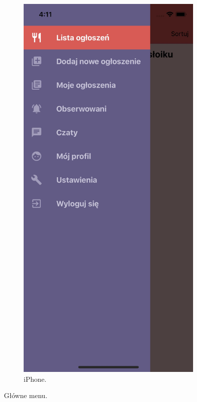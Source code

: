 \documentclass[licencjacka]{pracamgr}
\begin{document}
\begin{figure}[h!]
\begin{subfigure}[b]{0.4\linewidth}
    \includegraphics[width=\linewidth]{ios3.jpg}
    \caption{iPhone.}
  \end{subfigure}
  \caption{Główne menu.}
  \label{fig:offers}
\end{figure}
\end{document}
